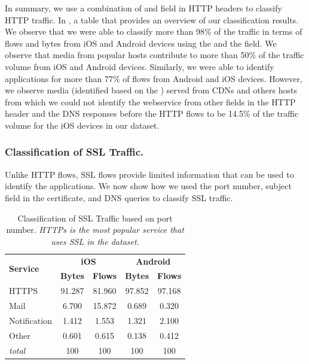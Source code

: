 In summary, we use a combination of \useragent and \httphost field in HTTP headers to classify HTTP traffic.
In , a table that provides an overview of our classification results.
We observe that we were able to classify more than 98\% of the traffic in terms of flows and bytes from iOS and Android devices using the \useragent and the \httphost field. 
We observe that media from popular hosts contribute to more than 50\% of the traffic volume from iOS and Android devices.
Similarly, we were able to identify applications for more than 77\% of flows from Android and iOS devices. 
However, we observe media (identified based on the \useragent) served from CDNs and others hosts from which we could not identify the webservice from other fields in the HTTP header and the DNS responses before the HTTP flows to be 14.5\% of the traffic volume for the iOS devices in our dataset.

\subsubsection{Classification of SSL Traffic.}

Unlike HTTP flows, SSL flows provide limited information that can be used to identify the applications. 
We now show how we used the port number, subject field in the certificate, and DNS queries to classify SSL traffic. 

\begin{table}
\centering
\begin{small}
\begin{tabular}{|p{}|c|c|c|c|}
\hline
\multirow{2}{*}{\bf Service} & \multicolumn{2}{c|}{\bf iOS} &  \multicolumn{2}{c|}{\bf Android} \tabularnewline
\cline{2-5}
  & {\bf Bytes}  & {\bf Flows} & {\bf Bytes} & {\bf Flows} \tabularnewline
\hline
HTTPS                   & 91.287 & 81.960 & 97.852 & 97.168    \tabularnewline
\hline
Mail                    &  6.700 & 15.872 & 0.689  & 0.320  \tabularnewline
\hline
Notification            &  1.412 & 1.553  & 1.321  & 2.100  \tabularnewline
\hline
Other                   &  0.601 & 0.615  & 0.138  & 0.412 \tabularnewline
\hline
{\em total}             & 100 & 100 & 100 & 100 \tabularnewline
\hline
\end{tabular}
\end{small}
\caption{Classification of SSL Traffic based on port number. \emph{HTTPs is the most popular service that uses SSL in the \mobWild dataset.}}
\label{tab:classify-ssl-port}
\end{table}

